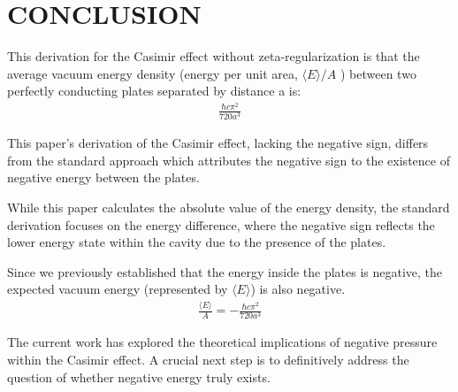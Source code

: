 \section{CONCLUSION}


This derivation for the Casimir effect without zeta-regularization is that the average vacuum energy density 
(energy per unit area, \(\langle E \rangle/A\) ) between two perfectly conducting plates separated by distance a is:
\begin{align}\frac{\hbar c \pi^2}{720 a^3}\end{align}

This paper's derivation of the Casimir effect, lacking the negative sign,  
differs from the standard approach which attributes the negative sign to the existence of negative energy between the plates. 

While this paper calculates the absolute value of the energy density, the standard derivation focuses on the energy difference, 
where the negative sign reflects the lower energy state within the cavity due to the presence of the plates.

Since we previously established that the energy inside the plates is negative, 
the expected vacuum energy (represented by $\langle E \rangle$) is also negative.
\begin{align}
    \frac{\langle E \rangle}{A} = -\frac{\hbar c \pi^2}{720 a^3}
\end{align}

The current work has explored the theoretical implications of negative pressure within the Casimir effect. 
A crucial next step is to definitively address the question of whether negative energy truly exists.